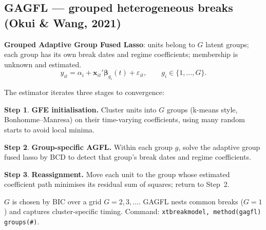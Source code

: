 \documentclass[11pt,a4paper]{article}
\newcommand{\cmd}[1]{\texttt{\textcolor{camber}{#1}}}
\newcommand{\hlt}[2]{\textcolor{#1}{\textbf{#2}}}
\newcommand{\bbeta}{\boldsymbol{\beta}}
\newcommand{\bx}{\mathbf{x}}
\theoremstyle{definition}
\newtheorem{step}{Step}
\begin{document}
\subsection{GAGFL --- grouped heterogeneous breaks (Okui \& Wang, 2021)}
\begin{definition}[GAGFL]
\hlt{cblue}{Grouped Adaptive Group Fused Lasso}: units belong to $G$ latent groups; each group has its
own break dates and regime coefficients; membership is unknown and estimated.
\[
y_{it}=\alpha_i+\bx_{it}'\bbeta_{g_i}(t)+\varepsilon_{it},\qquad g_i\in\{1,\dots,G\}.
\]
\end{definition}
The estimator iterates three stages to convergence:
\begin{step}\textbf{GFE initialisation.} Cluster units into $G$ groups (k-means style,
Bonhomme--Manresa) on their time-varying coefficients, using many random starts to avoid local
minima.\end{step}
\begin{step}\textbf{Group-specific AGFL.} Within each group $g$, solve the adaptive group fused lasso
by BCD to detect that group's break dates and regime coefficients.\end{step}
\begin{step}\textbf{Reassignment.} Move each unit to the group whose estimated coefficient path
minimises its residual sum of squares; return to Step~2.\end{step}
$G$ is chosen by BIC over a grid $G=2,3,\dots$. GAGFL nests common breaks ($G=1$) and captures
cluster-specific timing. Command: \cmd{xtbreakmodel, method(gagfl) groups(\#)}.
\end{document}
